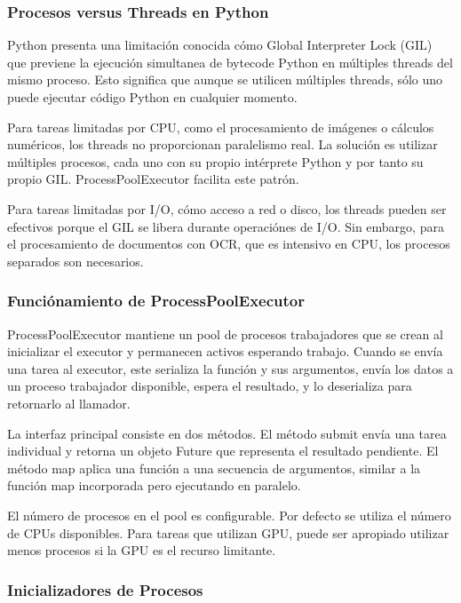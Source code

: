 \documentclass[12pt,a4paper,twoside]{book}
\begin{document}
\subsubsection{Procesos versus Threads en Python}

Python presenta una limitación conocida cómo Global Interpreter Lock (GIL) que previene la ejecución simultanea de bytecode Python en múltiples threads del mismo proceso. Esto significa que aunque se utilicen múltiples threads, sólo uno puede ejecutar código Python en cualquier momento.

Para tareas limitadas por CPU, como el procesamiento de imágenes o cálculos numéricos, los threads no proporcionan paralelismo real. La solución es utilizar múltiples procesos, cada uno con su propio intérprete Python y por tanto su propio GIL. ProcessPoolExecutor facilita este patrón.

Para tareas limitadas por I/O, cómo acceso a red o disco, los threads pueden ser efectivos porque el GIL se libera durante operaciónes de I/O. Sin embargo, para el procesamiento de documentos con OCR, que es intensivo en CPU, los procesos separados son necesarios.

\subsubsection{Funciónamiento de ProcessPoolExecutor}

ProcessPoolExecutor mantiene un pool de procesos trabajadores que se crean al inicializar el executor y permanecen activos esperando trabajo. Cuando se envía una tarea al executor, este serializa la función y sus argumentos, envía los datos a un proceso trabajador disponible, espera el resultado, y lo deserializa para retornarlo al llamador.

La interfaz principal consiste en dos métodos. El método submit envía una tarea individual y retorna un objeto Future que representa el resultado pendiente. El método map aplica una función a una secuencia de argumentos, similar a la función map incorporada pero ejecutando en paralelo.

El número de procesos en el pool es configurable. Por defecto se utiliza el número de CPUs disponibles. Para tareas que utilizan GPU, puede ser apropiado utilizar menos procesos si la GPU es el recurso limitante.

\subsubsection{Inicializadores de Procesos}
\end{document}
